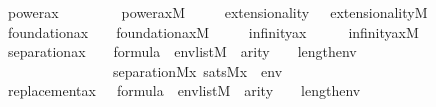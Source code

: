 \begin{isabellebody}
\ \ \ \ \ power{\isacharunderscore}{\kern0pt}ax{\isacharcolon}{\kern0pt}\ \ \ \ \ \ \ \ \ {\isachardoublequoteopen}power{\isacharunderscore}{\kern0pt}ax{\isacharparenleft}{\kern0pt}{\isacharhash}{\kern0pt}{\isacharhash}{\kern0pt}M{\isacharparenright}{\kern0pt}{\isachardoublequoteclose}\isanewline
\ \ \ \ \ extensionality{\isacharcolon}{\kern0pt}\ \ \ {\isachardoublequoteopen}extensionality{\isacharparenleft}{\kern0pt}{\isacharhash}{\kern0pt}{\isacharhash}{\kern0pt}M{\isacharparenright}{\kern0pt}{\isachardoublequoteclose}\isanewline
\ \ \ \ \ foundation{\isacharunderscore}{\kern0pt}ax{\isacharcolon}{\kern0pt}\ \ \ \ {\isachardoublequoteopen}foundation{\isacharunderscore}{\kern0pt}ax{\isacharparenleft}{\kern0pt}{\isacharhash}{\kern0pt}{\isacharhash}{\kern0pt}M{\isacharparenright}{\kern0pt}{\isachardoublequoteclose}\isanewline
\ \ \ \ \ infinity{\isacharunderscore}{\kern0pt}ax{\isacharcolon}{\kern0pt}\ \ \ \ \ \ {\isachardoublequoteopen}infinity{\isacharunderscore}{\kern0pt}ax{\isacharparenleft}{\kern0pt}{\isacharhash}{\kern0pt}{\isacharhash}{\kern0pt}M{\isacharparenright}{\kern0pt}{\isachardoublequoteclose}\isanewline
\ \ \ \ \ separation{\isacharunderscore}{\kern0pt}ax{\isacharcolon}{\kern0pt}\ \ \ \ {\isachardoublequoteopen}{\isasymphi}{\isasymin}formula\ {\isasymLongrightarrow}\ env{\isasymin}list{\isacharparenleft}{\kern0pt}M{\isacharparenright}{\kern0pt}\ {\isasymLongrightarrow}\ arity{\isacharparenleft}{\kern0pt}{\isasymphi}{\isacharparenright}{\kern0pt}\ {\isasymle}\ {}\ {\isacharhash}{\kern0pt}{\isacharplus}{\kern0pt}\ length{\isacharparenleft}{\kern0pt}env{\isacharparenright}{\kern0pt}\ {\isasymLongrightarrow}\isanewline
\ \ \ \ \ \ \ \ \ \ \ \ \ \ \ \ \ \ \ \ separation{\isacharparenleft}{\kern0pt}{\isacharhash}{\kern0pt}{\isacharhash}{\kern0pt}M{\isacharcomma}{\kern0pt}{\isasymlambda}x{\isachardot}{\kern0pt}\ sats{\isacharparenleft}{\kern0pt}M{\isacharcomma}{\kern0pt}{\isasymphi}{\isacharcomma}{\kern0pt}{\isacharbrackleft}{\kern0pt}x{\isacharbrackright}{\kern0pt}\ {\isacharat}{\kern0pt}\ env{\isacharparenright}{\kern0pt}{\isacharparenright}{\kern0pt}{\isachardoublequoteclose}\ \isanewline
\ \ \ \ \ replacement{\isacharunderscore}{\kern0pt}ax{\isacharcolon}{\kern0pt}\ \ \ {\isachardoublequoteopen}{\isasymphi}{\isasymin}formula\ {\isasymLongrightarrow}\ env{\isasymin}list{\isacharparenleft}{\kern0pt}M{\isacharparenright}{\kern0pt}\ {\isasymLongrightarrow}\ arity{\isacharparenleft}{\kern0pt}{\isasymphi}{\isacharparenright}{\kern0pt}\ {\isasymle}\ {}\ {\isacharhash}{\kern0pt}{\isacharplus}{\kern0pt}\ length{\isacharparenleft}{\kern0pt}env{\isacharparenright}{\kern0pt}\ {\isasymLongrightarrow}\ \isanewline

\end{isabellebody}

